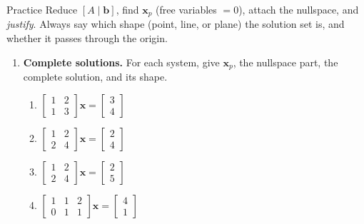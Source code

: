 \documentclass[10pt]{article}
\newcommand{\xx}{\mathbf{x}}
\newcommand{\bb}{\mathbf{b}}
\begin{document}
\namedateperiod

\vspace{0.12in}

\begin{notesbox}{Practice}
Reduce $[A\mid\bb]$, find $\xx_p$ (free variables $=0$), attach the nullspace, and \emph{justify}. Always
say which shape (point, line, or plane) the solution set is, and whether it passes through the origin.

\begin{enumerate}[leftmargin=1.9em, itemsep=11pt]
  \item \textbf{Complete solutions.} For each system, give $\xx_p$, the nullspace part, the complete
        solution, and its shape.
    \begin{enumerate}[label=(\alph*), leftmargin=1.8em, itemsep=6pt]
      \item $\begin{bmatrix} 1 & 2 \\ 1 & 3 \end{bmatrix}\xx=\begin{bmatrix} 3 \\ 4 \end{bmatrix}$ \vspace{0.9cm}
      \item $\begin{bmatrix} 1 & 2 \\ 2 & 4 \end{bmatrix}\xx=\begin{bmatrix} 2 \\ 4 \end{bmatrix}$ \vspace{0.9cm}
      \item $\begin{bmatrix} 1 & 2 \\ 2 & 4 \end{bmatrix}\xx=\begin{bmatrix} 2 \\ 5 \end{bmatrix}$ \vspace{0.9cm}
      \item $\begin{bmatrix} 1 & 1 & 2 \\ 0 & 1 & 1 \end{bmatrix}\xx=\begin{bmatrix} 4 \\ 1 \end{bmatrix}$ \vspace{1.1cm}

\end{enumerate}
\end{enumerate}
\end{notesbox}
\end{document}
